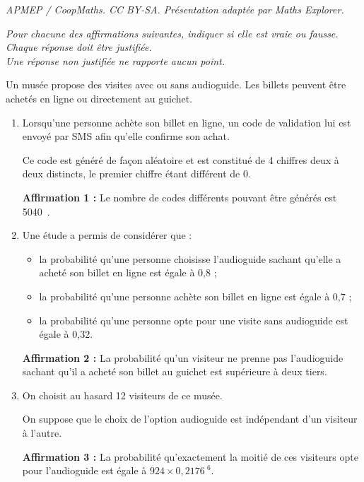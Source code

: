 \documentclass[10pt]{article}
\providecommand{\np}[2][]{{#2~#1}}
\begin{document}
\noindent\textit{APMEP / CoopMaths. CC BY-SA. Présentation adaptée par Maths Explorer.}\par\medskip
\medskip

\emph{Pour chacune des affirmations suivantes, indiquer si elle est vraie ou fausse.\\
 Chaque réponse doit être justifiée.\\
 Une réponse non justifiée ne rapporte aucun point.}

\medskip

Un musée propose des visites avec ou sans audioguide. Les billets peuvent être achetés en ligne ou directement au guichet.

\medskip

\begin{enumerate}
\item Lorsqu'une personne achète son billet en ligne, un code de validation lui est envoyé par SMS afin qu'elle confirme son achat.

Ce code est généré de façon aléatoire et est constitué de 4 chiffres deux à deux distincts, le premier chiffre étant différent de 0.

\medskip

\textbf{Affirmation 1 :} Le nombre de codes différents pouvant être générés est \np{5040}.
\item Une étude a permis de considérer que :
\begin{itemize}
\item la probabilité qu'une personne choisisse l'audioguide sachant qu'elle a acheté
son billet en ligne est égale à 0,8 ;
\item la probabilité qu'une personne achète son billet en ligne est égale à 0,7 ;
\item la probabilité qu'une personne opte pour une visite sans audioguide
est égale à 0,32.
\end{itemize}

\medskip

\textbf{Affirmation 2 :} La probabilité qu'un visiteur ne prenne pas l'audioguide
sachant qu'il a acheté son billet au guichet est supérieure à deux tiers.
\item On choisit au hasard 12 visiteurs de ce musée.

On suppose que le choix de l'option \og audioguide \fg{} est indépendant d'un visiteur à l'autre.

\medskip

\textbf{Affirmation 3 :} La probabilité qu'exactement la moitié de ces visiteurs opte pour l'audioguide est égale à $924 \times \np{0,2176}^6$.


\end{enumerate}
\end{document}
